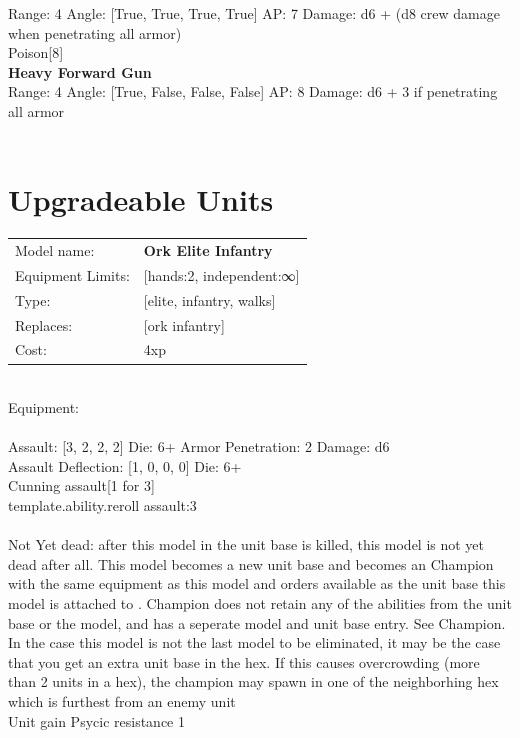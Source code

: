 Range: 4  Angle: [True, True, True, True] AP: 7 Damage: d6 + (d8 crew damage when penetrating all armor) \\
Poison[8]\\ 




{\bf Heavy Forward Gun } \\



Range: 4  Angle: [True, False, False, False] AP: 8 Damage: d6 + 3 if penetrating all armor \\




 
\ \\













\section{Upgradeable Units}\noindent
\begin{tabular}{ll}
Model name: &{\bf Ork Elite Infantry } \\
Equipment Limits: &[hands:2, independent:∞] \\
Type: &[elite, infantry, walks] \\
Replaces: &[ork infantry] \\
Cost: & 4xp\\
\end{tabular}
\ \\
Equipment:  \\
\ \\
Assault: [3, 2, 2, 2] Die: 6+ Armor Penetration: 2 Damage: d6 \\
Assault Deflection: [1, 0, 0, 0] Die: 6+\\
\indent Cunning assault[1 for 3]\\ 
{template.ability.reroll assault:3}\\ 
 
\ \\
Not Yet dead: after this model in the unit base is killed, this model is not yet dead after all. This model becomes a new unit base and becomes an Champion with the same equipment as this model and orders available as the unit base this model is attached to . Champion does not retain any of the abilities from the unit base or the model, and has a seperate model and unit base entry. See Champion. In the case this model is not the last model to be eliminated, it may be the case that you get an extra unit base in the hex. If this causes overcrowding (more than 2 units in a hex), the champion may spawn in one of the neighborhing hex which is furthest from an enemy unit\\ 
Unit gain Psycic resistance 1\\ 

